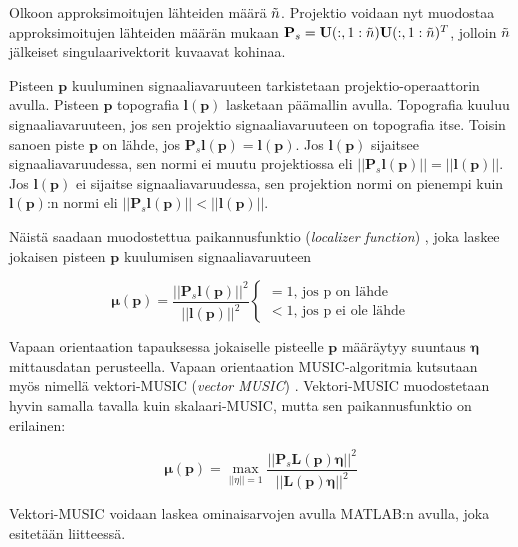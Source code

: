 Olkoon approksimoitujen lähteiden määrä $\Tilde{n}$. Projektio voidaan nyt muodostaa approksimoitujen lähteiden määrän mukaan $\mathbf{P}_{s}=\mathbf{U}(:,1:\Tilde{n})\mathbf{U}(:,1:\Tilde{n})^T$, jolloin $\Tilde{n}$ jälkeiset singulaarivektorit kuvaavat kohinaa.

Pisteen $\mathbf{p}$ kuuluminen signaaliavaruuteen tarkistetaan projektio-operaattorin avulla. Pisteen $\mathbf{p}$ topografia $\mathbf{l(p)}$ lasketaan päämallin avulla. Topografia kuuluu signaaliavaruuteen, jos sen projektio signaaliavaruuteen on topografia itse. Toisin sanoen piste $\mathbf{p}$ on lähde, jos $\mathbf{P}_s\mathbf{l(p)} = \mathbf{l(p)}$. Jos $\mathbf{l(p)}$ sijaitsee signaaliavaruudessa, sen normi ei muutu projektiossa eli $||\mathbf{P}_s\mathbf{l(p)}||=||\mathbf{l(p)}||$. Jos $\mathbf{l(p)}$ ei sijaitse signaaliavaruudessa, sen projektion normi on pienempi kuin $\mathbf{l(p)}$:n normi eli
$||\mathbf{P}_s\mathbf{l(p)}||<||\mathbf{l(p)}||$. \citep{Makela2018TruncatedLocalization}

Näistä saadaan muodostettua paikannusfunktio (\textit{localizer function}) \citep{Makela2018TruncatedLocalization}, joka laskee jokaisen pisteen $\mathbf{p}$ kuulumisen signaaliavaruuteen

\begin{equation}
    \mathbf{\mu(p)} = \frac{||\mathbf{P}_s\mathbf{l(p)}||^2}{||\mathbf{l(p)}||^2} 
    \begin{cases}
    =1\text{, jos p on lähde}\\
    <1\text{, jos p ei ole lähde}
     \end{cases}
\end{equation}

Vapaan orientaation tapauksessa jokaiselle pisteelle $\mathbf{p}$ määräytyy suuntaus $\mathbf{\eta}$ mittausdatan perusteella. Vapaan orientaation MUSIC-algoritmia kutsutaan myös nimellä vektori-MUSIC (\textit{vector MUSIC}) \citep{Makela2018TruncatedLocalization}. Vektori-MUSIC muodostetaan hyvin samalla tavalla kuin skalaari-MUSIC, mutta sen paikannusfunktio on erilainen:

\begin{equation}
    \mathbf{\mu(p)} = \max_{||\eta||=1} \frac{||\mathbf{P}_s\mathbf{L(p)\eta}||^2}{||\mathbf{L(p)\eta}||^2}
\end{equation}

Vektori-MUSIC voidaan laskea ominaisarvojen avulla MATLAB:n avulla, joka esitetään liitteessä.